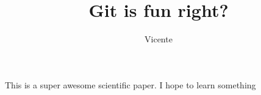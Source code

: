 \documentclass[10pt]{article}
\author{Vicente}
\title{Git is fun right?}
\begin{document}
	\maketitle

	This is a super awesome scientific paper.
	I hope to learn something
\end{document}
